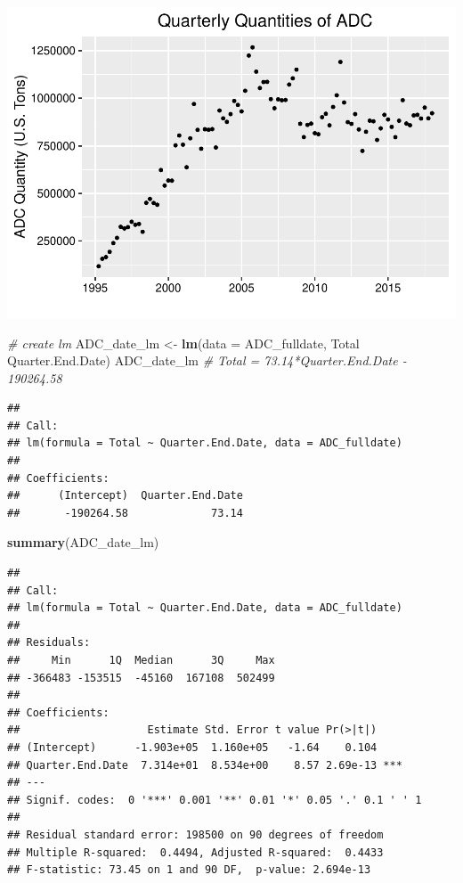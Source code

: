 \documentclass[12pt,]{article}
\newenvironment{Shaded}{\begin{snugshade}}{\end{snugshade}}
\newcommand{\KeywordTok}[1]{\textcolor[rgb]{0.13,0.29,0.53}{\textbf{#1}}}
\newcommand{\DataTypeTok}[1]{\textcolor[rgb]{0.13,0.29,0.53}{#1}}
\newcommand{\StringTok}[1]{\textcolor[rgb]{0.31,0.60,0.02}{#1}}
\newcommand{\CommentTok}[1]{\textcolor[rgb]{0.56,0.35,0.01}{\textit{#1}}}
\newcommand{\OperatorTok}[1]{\textcolor[rgb]{0.81,0.36,0.00}{\textbf{#1}}}
\newcommand{\NormalTok}[1]{#1}
\begin{document}
\includegraphics{SKo_Project_Template_files/figure-latex/Test2_1-1.pdf}

\begin{Shaded}
\begin{Highlighting}[]
\CommentTok{# create lm}
\NormalTok{ADC_date_lm <-}\StringTok{ }\KeywordTok{lm}\NormalTok{(}\DataTypeTok{data =}\NormalTok{ ADC_fulldate, Total }\OperatorTok{~}\StringTok{ }\NormalTok{Quarter.End.Date)}
\NormalTok{ADC_date_lm }\CommentTok{# Total = 73.14*Quarter.End.Date - 190264.58}
\end{Highlighting}
\end{Shaded}

\begin{verbatim}
## 
## Call:
## lm(formula = Total ~ Quarter.End.Date, data = ADC_fulldate)
## 
## Coefficients:
##      (Intercept)  Quarter.End.Date  
##       -190264.58             73.14
\end{verbatim}

\begin{Shaded}
\begin{Highlighting}[]
\KeywordTok{summary}\NormalTok{(ADC_date_lm) }
\end{Highlighting}
\end{Shaded}

\begin{verbatim}
## 
## Call:
## lm(formula = Total ~ Quarter.End.Date, data = ADC_fulldate)
## 
## Residuals:
##     Min      1Q  Median      3Q     Max 
## -366483 -153515  -45160  167108  502499 
## 
## Coefficients:
##                    Estimate Std. Error t value Pr(>|t|)    
## (Intercept)      -1.903e+05  1.160e+05   -1.64    0.104    
## Quarter.End.Date  7.314e+01  8.534e+00    8.57 2.69e-13 ***
## ---
## Signif. codes:  0 '***' 0.001 '**' 0.01 '*' 0.05 '.' 0.1 ' ' 1
## 
## Residual standard error: 198500 on 90 degrees of freedom
## Multiple R-squared:  0.4494, Adjusted R-squared:  0.4433 
## F-statistic: 73.45 on 1 and 90 DF,  p-value: 2.694e-13
\end{verbatim}
\end{document}
